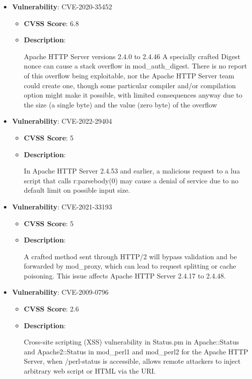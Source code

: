 \documentclass{article}
\begin{document}
\begin{itemize}
        \item \textbf{Vulnerability}: CVE-2020-35452
        \begin{itemize}
            \item \textbf{CVSS Score}:  6.8 
            \item \textbf{Description}:
            \parbox[t]{0.9\linewidth}{
                \ttfamily Apache HTTP Server versions 2.4.0 to 2.4.46 A specially crafted Digest nonce can cause a stack overflow in mod\_auth\_digest. There is no report of this overflow being exploitable, nor the Apache HTTP Server team could create one, though some particular compiler and/or compilation option might make it possible, with limited consequences anyway due to the size (a single byte) and the value (zero byte) of the overflow
            }
        \end{itemize}
    
        \item \textbf{Vulnerability}: CVE-2022-29404
        \begin{itemize}
            \item \textbf{CVSS Score}:  5 
            \item \textbf{Description}:
            \parbox[t]{0.9\linewidth}{
                \ttfamily In Apache HTTP Server 2.4.53 and earlier, a malicious request to a lua script that calls r:parsebody(0) may cause a denial of service due to no default limit on possible input size.
            }
        \end{itemize}
    
        \item \textbf{Vulnerability}: CVE-2021-33193
        \begin{itemize}
            \item \textbf{CVSS Score}:  5 
            \item \textbf{Description}:
            \parbox[t]{0.9\linewidth}{
                \ttfamily A crafted method sent through HTTP/2 will bypass validation and be forwarded by mod\_proxy, which can lead to request splitting or cache poisoning. This issue affects Apache HTTP Server 2.4.17 to 2.4.48.
            }
        \end{itemize}
    
        \item \textbf{Vulnerability}: CVE-2009-0796
        \begin{itemize}
            \item \textbf{CVSS Score}:  2.6 
            \item \textbf{Description}:
            \parbox[t]{0.9\linewidth}{
                \ttfamily Cross-site scripting (XSS) vulnerability in Status.pm in Apache::Status and Apache2::Status in mod\_perl1 and mod\_perl2 for the Apache HTTP Server, when /perl-status is accessible, allows remote attackers to inject arbitrary web script or HTML via the URI.
            }
        \end{itemize}
    

\end{itemize}
\end{document}
